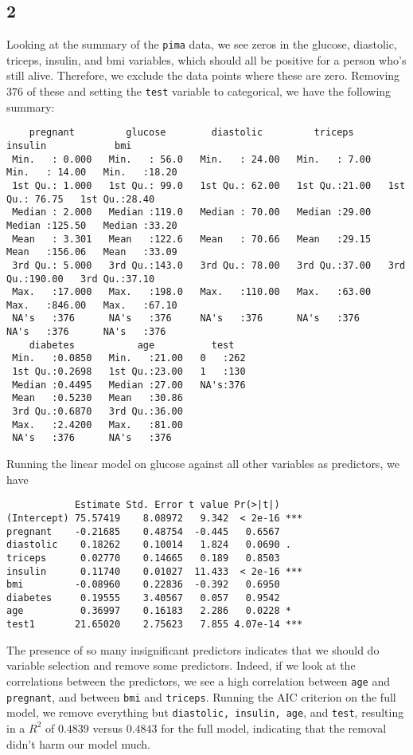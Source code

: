 \documentclass{article}
\begin{document}
\subsection*{2}
Looking at the summary of the \verb|pima| data, we see zeros in the glucose, diastolic, triceps, insulin, and bmi variables, which should all be positive for a person who's still alive. Therefore, we exclude the data points where these are zero. Removing $376$ of these and setting the \verb|test| variable to categorical, we have the following summary:
\begin{verbatim}
    pregnant         glucose        diastolic         triceps         insulin            bmi       
 Min.   : 0.000   Min.   : 56.0   Min.   : 24.00   Min.   : 7.00   Min.   : 14.00   Min.   :18.20  
 1st Qu.: 1.000   1st Qu.: 99.0   1st Qu.: 62.00   1st Qu.:21.00   1st Qu.: 76.75   1st Qu.:28.40  
 Median : 2.000   Median :119.0   Median : 70.00   Median :29.00   Median :125.50   Median :33.20  
 Mean   : 3.301   Mean   :122.6   Mean   : 70.66   Mean   :29.15   Mean   :156.06   Mean   :33.09  
 3rd Qu.: 5.000   3rd Qu.:143.0   3rd Qu.: 78.00   3rd Qu.:37.00   3rd Qu.:190.00   3rd Qu.:37.10  
 Max.   :17.000   Max.   :198.0   Max.   :110.00   Max.   :63.00   Max.   :846.00   Max.   :67.10  
 NA's   :376      NA's   :376     NA's   :376      NA's   :376     NA's   :376      NA's   :376    
    diabetes           age          test    
 Min.   :0.0850   Min.   :21.00   0   :262  
 1st Qu.:0.2698   1st Qu.:23.00   1   :130  
 Median :0.4495   Median :27.00   NA's:376  
 Mean   :0.5230   Mean   :30.86             
 3rd Qu.:0.6870   3rd Qu.:36.00             
 Max.   :2.4200   Max.   :81.00             
 NA's   :376      NA's   :376
\end{verbatim}
Running the linear model on glucose against all other variables as predictors, we have
\begin{verbatim}
            Estimate Std. Error t value Pr(>|t|)    
(Intercept) 75.57419    8.08972   9.342  < 2e-16 ***
pregnant    -0.21685    0.48754  -0.445   0.6567    
diastolic    0.18262    0.10014   1.824   0.0690 .  
triceps      0.02770    0.14665   0.189   0.8503    
insulin      0.11740    0.01027  11.433  < 2e-16 ***
bmi         -0.08960    0.22836  -0.392   0.6950    
diabetes     0.19555    3.40567   0.057   0.9542    
age          0.36997    0.16183   2.286   0.0228 *  
test1       21.65020    2.75623   7.855 4.07e-14 ***
\end{verbatim}
The presence of so many insignificant predictors indicates that we should do variable selection and remove some predictors. Indeed, if we look at the correlations between the predictors, we see a high correlation between \verb|age| and \verb|pregnant|, and between \verb|bmi| and \verb|triceps|. Running the AIC criterion on the full model, we remove everything but \verb|diastolic, insulin, age|, and \verb|test|, resulting in a $R^2$ of $0.4839$ versus $0.4843$ for the full model, indicating that the removal didn't harm our model much.
\end{document}
